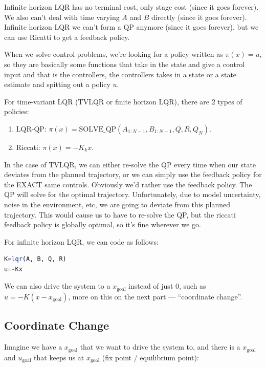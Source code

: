 Infinite horizon LQR has no terminal cost, only stage cost (since it goes forever). We also can't deal with time varying $A$ and $B$ directly (since it goes forever). Infinite horizon LQR we can't form a QP anymore (since it goes forever), but we can use Ricatti to get a feedback policy. 

When we solve control problems, we're looking for a policy written as $\pi(x) = u$, so they are basically some functions that take in the state and give a control input and that is the controllers, the controllers takes in a state or a state estimate and spitting out a policy $u$.

For time-variant LQR (TVLQR or finite horizon LQR), there are 2 types of policies:

\begin{enumerate}
    \item LQR-QP: $\pi(x)=\text{SOLVE\_QP}(A_{1:N-1}, B_{1:N-1}, Q, R, Q_N)$.
    \item Riccati: $\pi(x) = -K_k x$.
\end{enumerate}

In the case of TVLQR, we can either re-solve the QP every time when our state deviates from the planned trajectory, or we can simply use the feedback policy for the EXACT same controls. Obviously we'd rather use the feedback policy. The QP will solve for the optimal trajectory. Unfortunately, due to model uncertainty, noise in the environment, etc, we are going to deviate from this planned trajectory. This would cause us to have to re-solve the QP, but the riccati feedback policy is globally optimal, so it's fine wherever we go. 

For infinite horizon LQR, we can code as follows:

\begin{lstlisting}[language=julia]
K=lqr(A, B, Q, R)
u=-Kx
\end{lstlisting}

We can also drive the system to a $x_{\text{goal}}$ instead of just $0$, such as $u=-K(x - x_{\text{goal}})$, more on this on the next part --- ``coordinate change''. 

\subsection{Coordinate Change}

Imagine we have a $x_{\text{goal}}$ that we want to drive the system to, and there is a $x_{\text{goal}}$ and $u_{\text{goal}}$ that keeps us at $x_{\text{goal}}$ (fix point / equilibrium point):

